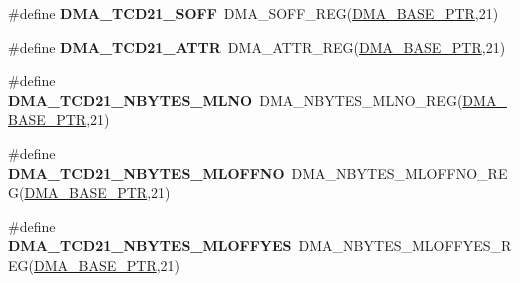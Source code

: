 \begin{DoxyCompactItemize}
\item 
\hypertarget{group___d_m_a___register___accessor___macros_ga290542154eb7c9c87722eed6104356cc}{}\#define {\bfseries D\+M\+A\+\_\+\+T\+C\+D21\+\_\+\+S\+O\+F\+F}~D\+M\+A\+\_\+\+S\+O\+F\+F\+\_\+\+R\+E\+G(\hyperlink{group___d_m_a___peripheral_ga6997fbc1b1973e9f27170217a3bd6f22}{D\+M\+A\+\_\+\+B\+A\+S\+E\+\_\+\+P\+T\+R},21)\label{group___d_m_a___register___accessor___macros_ga290542154eb7c9c87722eed6104356cc}

\item 
\hypertarget{group___d_m_a___register___accessor___macros_ga72f98207e26006135490bcc41336f2e7}{}\#define {\bfseries D\+M\+A\+\_\+\+T\+C\+D21\+\_\+\+A\+T\+T\+R}~D\+M\+A\+\_\+\+A\+T\+T\+R\+\_\+\+R\+E\+G(\hyperlink{group___d_m_a___peripheral_ga6997fbc1b1973e9f27170217a3bd6f22}{D\+M\+A\+\_\+\+B\+A\+S\+E\+\_\+\+P\+T\+R},21)\label{group___d_m_a___register___accessor___macros_ga72f98207e26006135490bcc41336f2e7}

\item 
\hypertarget{group___d_m_a___register___accessor___macros_gaf27bf5976a2ec8cf3fb74e1bb6b82112}{}\#define {\bfseries D\+M\+A\+\_\+\+T\+C\+D21\+\_\+\+N\+B\+Y\+T\+E\+S\+\_\+\+M\+L\+N\+O}~D\+M\+A\+\_\+\+N\+B\+Y\+T\+E\+S\+\_\+\+M\+L\+N\+O\+\_\+\+R\+E\+G(\hyperlink{group___d_m_a___peripheral_ga6997fbc1b1973e9f27170217a3bd6f22}{D\+M\+A\+\_\+\+B\+A\+S\+E\+\_\+\+P\+T\+R},21)\label{group___d_m_a___register___accessor___macros_gaf27bf5976a2ec8cf3fb74e1bb6b82112}

\item 
\hypertarget{group___d_m_a___register___accessor___macros_ga4fa1a4b706363f94301598cb151d36ff}{}\#define {\bfseries D\+M\+A\+\_\+\+T\+C\+D21\+\_\+\+N\+B\+Y\+T\+E\+S\+\_\+\+M\+L\+O\+F\+F\+N\+O}~D\+M\+A\+\_\+\+N\+B\+Y\+T\+E\+S\+\_\+\+M\+L\+O\+F\+F\+N\+O\+\_\+\+R\+E\+G(\hyperlink{group___d_m_a___peripheral_ga6997fbc1b1973e9f27170217a3bd6f22}{D\+M\+A\+\_\+\+B\+A\+S\+E\+\_\+\+P\+T\+R},21)\label{group___d_m_a___register___accessor___macros_ga4fa1a4b706363f94301598cb151d36ff}

\item 
\hypertarget{group___d_m_a___register___accessor___macros_gade20d020933533c0394f53061bbcc9e7}{}\#define {\bfseries D\+M\+A\+\_\+\+T\+C\+D21\+\_\+\+N\+B\+Y\+T\+E\+S\+\_\+\+M\+L\+O\+F\+F\+Y\+E\+S}~D\+M\+A\+\_\+\+N\+B\+Y\+T\+E\+S\+\_\+\+M\+L\+O\+F\+F\+Y\+E\+S\+\_\+\+R\+E\+G(\hyperlink{group___d_m_a___peripheral_ga6997fbc1b1973e9f27170217a3bd6f22}{D\+M\+A\+\_\+\+B\+A\+S\+E\+\_\+\+P\+T\+R},21)\label{group___d_m_a___register___accessor___macros_gade20d020933533c0394f53061bbcc9e7}


\end{DoxyCompactItemize}

